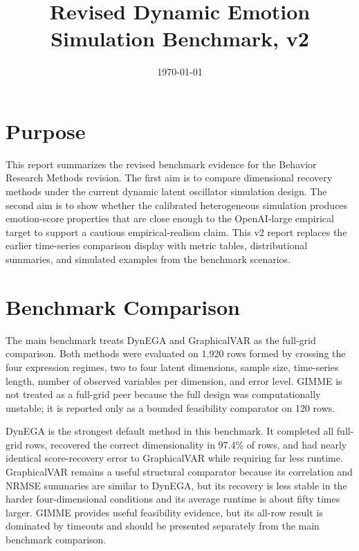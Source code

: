 \documentclass[11pt]{article}
\title{Revised Dynamic Emotion Simulation Benchmark, v2}
\author{}
\date{\today}
\begin{document}
\maketitle

\section{Purpose}

This report summarizes the revised benchmark evidence for the Behavior Research
Methods revision. The first aim is to compare dimensional recovery methods under
the current dynamic latent oscillator simulation design. The second aim is to
show whether the calibrated heterogeneous simulation produces emotion-score
properties that are close enough to the OpenAI-large empirical target to support
a cautious empirical-realism claim. This v2 report replaces the earlier
time-series comparison display with metric tables, distributional summaries, and
simulated examples from the benchmark scenarios.

\section{Benchmark Comparison}

The main benchmark treats DynEGA and GraphicalVAR as the full-grid comparison.
Both methods were evaluated on 1,920 rows formed by crossing the four expression
regimes, two to four latent dimensions, sample size, time-series length, number
of observed variables per dimension, and error level. GIMME is not treated as a
full-grid peer because the full design was computationally unstable; it is
reported only as a bounded feasibility comparator on 120 rows.

\begin{table}[H]
\centering
\caption{Method-level benchmark overview. Exact recovery is calculated over all
benchmark rows, so timeouts count against recovery. Runtime is the mean
wall-clock time per benchmark row.}
\label{tab:benchmark-overview-v2}
\small

\end{table}

DynEGA is the strongest default method in this benchmark. It completed all
full-grid rows, recovered the correct dimensionality in 97.4\% of rows, and had
nearly identical score-recovery error to GraphicalVAR while requiring far less
runtime. GraphicalVAR remains a useful structural comparator because its
correlation and NRMSE summaries are similar to DynEGA, but its recovery is less
stable in the harder four-dimensional conditions and its average runtime is
about fifty times larger. GIMME provides useful feasibility evidence, but its
all-row result is dominated by timeouts and should be presented separately from
the main benchmark comparison.
\end{document}
